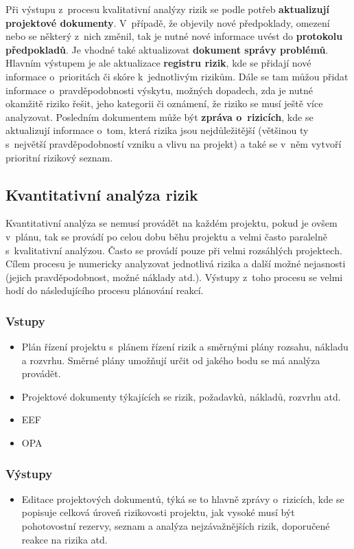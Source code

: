 Při výstupu z~procesu kvalitativní analýzy rizik se podle potřeb \textbf{aktualizují projektové dokumenty}. V~případě, že objevily nové předpoklady, omezení nebo se některý z~nich změnil, tak je nutné nové informace uvést do \textbf{protokolu předpokladů}. Je vhodné také aktualizovat \textbf{dokument správy problémů}. Hlavním výstupem je ale aktualizace \textbf{registru rizik}, kde se přidají nové informace o~prioritách či skóre k~jednotlivým rizikům. Dále se tam můžou přidat informace o~pravděpodobnosti výskytu, možných dopadech, zda je nutné okamžitě riziko řešit, jeho kategorii či oznámení, že riziko se musí ještě více analyzovat. Posledním dokumentem může být \textbf{zpráva o~rizicích}, kde se aktualizují informace o~tom, která rizika jsou nejdůležitější (většinou ty s~největší pravděpodobností vzniku a vlivu na projekt) a také se v~něm vytvoří prioritní rizikový seznam.


\subsection*{Kvantitativní analýza rizik}

Kvantitativní analýza se nemusí provádět na každém projektu, pokud je ovšem v~plánu, tak se provádí po celou dobu běhu projektu a velmi často paralelně s~kvalitativní analýzou.  Často se provádí pouze při velmi rozsáhlých projektech. Cílem procesu je numericky analyzovat jednotlivá rizika a další možné nejasnosti (jejich pravděpodobnost, možné náklady atd.). Výstupy z~toho procesu se velmi hodí do následujícího procesu plánování reakcí.

\subsubsection*{Vstupy}
\begin{itemize}
    \item Plán řízení projektu s~plánem řízení rizik a směrnými plány rozsahu, nákladu a rozvrhu. Směrné plány umožňují určit od jakého bodu se má analýza provádět.
    \item Projektové dokumenty týkajících se rizik, požadavků, nákladů, rozvrhu atd.
    \item EEF
    \item OPA
\end{itemize}
\subsubsection*{Výstupy}
\begin{itemize}
    \item Editace projektových dokumentů, týká se to hlavně zprávy o~rizicích, kde se popisuje celková úroveň rizikovosti projektu, jak vysoké musí být pohotovostní rezervy, seznam a analýza nejzávažnějších rizik, doporučené reakce na rizika atd.
\end{itemize}


